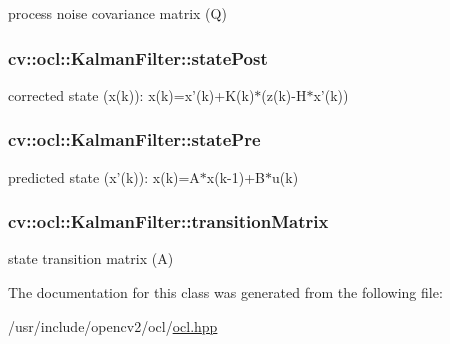 process noise covariance matrix (Q) 

\hypertarget{classcv_1_1ocl_1_1KalmanFilter_a7988dd038dc54b0a8506a4da0ddcf39b}{
\subsubsection[{state\-Post}]{ cv\-::ocl\-::\-Kalman\-Filter\-::state\-Post}}\label{classcv_1_1ocl_1_1KalmanFilter_a7988dd038dc54b0a8506a4da0ddcf39b}


corrected state (x(k))\-: x(k)=x'(k)+\-K(k)$\ast$(z(k)-\/\-H$\ast$x'(k)) 

\hypertarget{classcv_1_1ocl_1_1KalmanFilter_ac9e06e20a8d043a4564b835d422977b9}{
\subsubsection[{state\-Pre}]{ cv\-::ocl\-::\-Kalman\-Filter\-::state\-Pre}}\label{classcv_1_1ocl_1_1KalmanFilter_ac9e06e20a8d043a4564b835d422977b9}


predicted state (x'(k))\-: x(k)=A$\ast$x(k-\/1)+\-B$\ast$u(k) 

\hypertarget{classcv_1_1ocl_1_1KalmanFilter_ac31e8bbbeeabf0132ad39d39996f1b0f}{
\subsubsection[{transition\-Matrix}]{ cv\-::ocl\-::\-Kalman\-Filter\-::transition\-Matrix}}\label{classcv_1_1ocl_1_1KalmanFilter_ac31e8bbbeeabf0132ad39d39996f1b0f}


state transition matrix (A) 



The documentation for this class was generated from the following file\-:\begin{DoxyCompactItemize}
\item 
/usr/include/opencv2/ocl/\hyperlink{ocl_2ocl_8hpp}{ocl.\-hpp}\end{DoxyCompactItemize}

